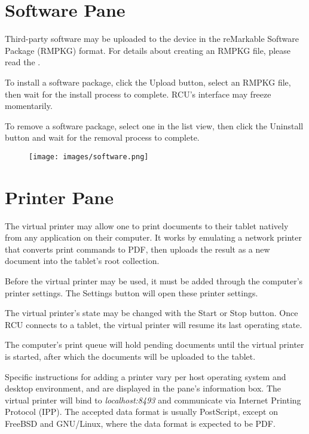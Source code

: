 \newpage
\section{Software Pane}
\label{sec:softwarepane}
Third-party software may be uploaded to the device in the reMarkable Software Package (RMPKG) format. For details about creating an RMPKG file, please read the .

To install a software package, click the Upload button, select an RMPKG file, then wait for the install process to complete. RCU's interface may freeze momentarily.

To remove a software package, select one in the list view, then click the Uninstall button and wait for the removal process to complete.

\vfill
\begin{figure}[h]
  \centering
  \texttt{[image: images/software.png]}
  \caption{}
  \label{fig:softwarepane}
\end{figure}
\vfill


\newpage
\section{Printer Pane}
\label{sec:printerpane}
The virtual printer may allow one to print documents to their tablet natively from any application on their computer. It works by emulating a network printer that converts print commands to PDF, then uploads the result as a new document into the tablet's root collection.

Before the virtual printer may be used, it must be added through the computer's printer settings. The Settings button will open these printer settings.

The virtual printer's state may be changed with the Start or Stop button. Once RCU connects to a tablet, the virtual printer will resume its last operating state.

The computer's print queue will hold pending documents until the virtual printer is started, after which the documents will be uploaded to the tablet.

Specific instructions for adding a printer vary per host operating system and desktop environment, and are displayed in the pane's information box. The virtual printer will bind to \textit{localhost:8493} and communicate via Internet Printing Protocol (IPP). The accepted data format is usually PostScript, except on FreeBSD and GNU/Linux, where the data format is expected to be PDF.

